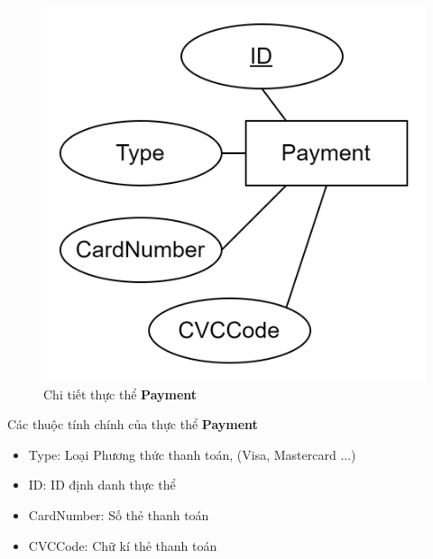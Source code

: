 \begin{figure}[h]
    \centering
    \includegraphics[scale = 0.20]{img/db/payment.png}
    \vspace{1cm}
    \caption{Chi tiết thực thể \textbf{Payment}}
    \label{fig:taskAssignment}
\end{figure}

Các thuộc tính chính của thực thể \textbf{Payment}
\begin{itemize}
    \item Type: Loại Phương thức thanh toán, (Visa, Mastercard ...)
    \item ID: ID định danh thực thể
    \item CardNumber: Số thẻ thanh toán
    \item CVCCode: Chữ kí thẻ thanh toán
\end{itemize}

